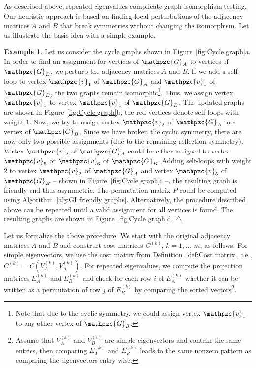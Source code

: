 \documentclass
[
    a4paper,
    DIV=11,
    abstracton
]
{scrartcl}
\newcommand{\mc}[1]{\mathpzc{#1}}
\newcommand\xqed[1]{\leavevmode\unskip\penalty9999 \hbox{}\nobreak\hfill \quad\hbox{#1}}
\newcommand{\exampleSymbol}{\xqed{$\triangle$}}
\theoremstyle{definition}
\newtheorem{example}[theorem]{Example}
\begin{document}
As described above, repeated eigenvalues complicate graph isomorphism testing. Our heuristic approach is based on finding local perturbations of the adjacency matrices $ A $ and $ B $ that break symmetries without changing the isomorphism. Let us illustrate the basic idea with a simple example.

\begin{example} \label{ex:Cycle graph motivation}
Let us consider the cycle graphs shown in Figure~\ref{fig:Cycle graph}a. In order to find an assignment for vertices of $ \mc{G}_A $ to vertices of $ \mc{G}_B $, we perturb the adjacency matrices $ A $ and $ B $. If we add a self-loop to vertex $ \mc{v}_1 $ of $ \mc{G}_A $ and $ \mc{v}_1 $ of $ \mc{G}_B $, the two graphs remain isomorphic\footnote{Note that due to the cyclic symmetry, we could assign vertex $ \mc{v}_1 $ to any other vertex of $ \mc{G}_B $.}. Thus, we assign vertex $ \mc{v}_1 $ to vertex $ \mc{v}_1 $ of $ \mc{G}_B $. The updated graphs are shown in Figure~\ref{fig:Cycle graph}b, the red vertices denote self-loops with weight $ 1 $. Now, we try to assign vertex $ \mc{v}_2 $ of $ \mc{G}_A $ to a vertex of $ \mc{G}_B $. Since we have broken the cyclic symmetry, there are now only two possible assignments (due to the remaining reflection symmetry). Vertex $ \mc{v}_2 $ of $ \mc{G}_A $ could be either assigned to vertex $ \mc{v}_5 $ or $ \mc{v}_6 $ of $ \mc{G}_B $. Adding self-loops with weight $ 2 $ to vertex $ \mc{v}_2 $ of $ \mc{G}_A $ and vertex $ \mc{v}_5 $ of $ \mc{G}_B $ -- shown in Figure~\ref{fig:Cycle graph}c --, the resulting graph is friendly and thus asymmetric. The permutation matrix $ P $ could be computed using Algorithm~\ref{alg:GI friendly graphs}. Alternatively, the procedure described above can be repeated until a valid assignment for all vertices is found. The resulting graphs are shown in Figure~\ref{fig:Cycle graph}d. \exampleSymbol
\end{example}

Let us formalize the above procedure. We start with the original adjacency matrices $ A $ and $ B $ and construct cost matrices $ C^{(k)} $, $ k = 1, \dots, m $,  as follows. For simple eigenvectors, we use the cost matrix from Definition~\ref{def:Cost matrix}, i.e., $ C^{(k)} = C(V_A^{(k)}, V_B^{(k)}) $. For repeated eigenvalues, we compute the projection matrices $ E_A^{(k)} $ and $ E_B^{(k)} $ and check for each row $ i $ of $ E_A^{(k)} $ whether it can be written as a permutation of row $ j $ of $ E_B^{(k)} $ by comparing the sorted vectors\footnote{Assume that $ V_A^{(k)} $ and $ V_B^{(k)} $ are simple eigenvectors and contain the same entries, then comparing $ E_A^{(k)} $ and $ E_B^{(k)} $ leads to the same nonzero pattern as comparing the eigenvectors entry-wise.}.
\end{document}
